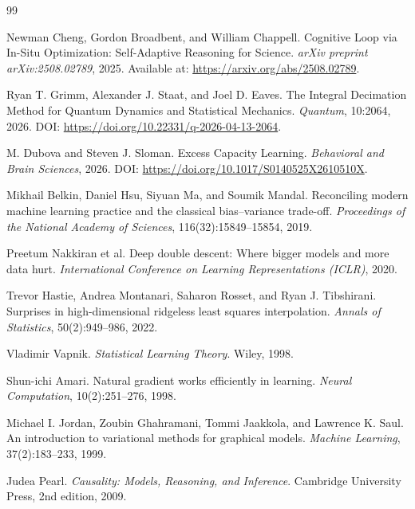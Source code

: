 \documentclass[11pt]{article}
\theoremstyle{plain}
\theoremstyle{definition}
\theoremstyle{remark}
\begin{document}
\newpage
\begin{thebibliography}{99}

Newman Cheng, Gordon Broadbent, and William Chappell.
\newblock Cognitive Loop via In-Situ Optimization: Self-Adaptive Reasoning for Science.
\newblock \emph{arXiv preprint arXiv:2508.02789}, 2025.
\newblock Available at: \url{https://arxiv.org/abs/2508.02789}.

Ryan T. Grimm, Alexander J. Staat, and Joel D. Eaves.
\newblock The Integral Decimation Method for Quantum Dynamics and Statistical Mechanics.
\newblock \emph{Quantum}, 10:2064, 2026.
\newblock DOI: \url{https://doi.org/10.22331/q-2026-04-13-2064}.

M. Dubova and Steven J. Sloman.
\newblock Excess Capacity Learning.
\newblock \emph{Behavioral and Brain Sciences}, 2026.
\newblock DOI: \url{https://doi.org/10.1017/S0140525X2610510X}.

Mikhail Belkin, Daniel Hsu, Siyuan Ma, and Soumik Mandal.
\newblock Reconciling modern machine learning practice and the classical bias--variance trade-off.
\newblock \emph{Proceedings of the National Academy of Sciences}, 116(32):15849--15854, 2019.

Preetum Nakkiran et al.
\newblock Deep double descent: Where bigger models and more data hurt.
\newblock \emph{International Conference on Learning Representations (ICLR)}, 2020.

Trevor Hastie, Andrea Montanari, Saharon Rosset, and Ryan J. Tibshirani.
\newblock Surprises in high-dimensional ridgeless least squares interpolation.
\newblock \emph{Annals of Statistics}, 50(2):949--986, 2022.

Vladimir Vapnik.
\newblock \emph{Statistical Learning Theory}.
\newblock Wiley, 1998.

Shun-ichi Amari.
\newblock Natural gradient works efficiently in learning.
\newblock \emph{Neural Computation}, 10(2):251--276, 1998.

Michael I. Jordan, Zoubin Ghahramani, Tommi Jaakkola, and Lawrence K. Saul.
\newblock An introduction to variational methods for graphical models.
\newblock \emph{Machine Learning}, 37(2):183--233, 1999.

Judea Pearl.
\newblock \emph{Causality: Models, Reasoning, and Inference}.
\newblock Cambridge University Press, 2nd edition, 2009.


\end{thebibliography}
\end{document}
